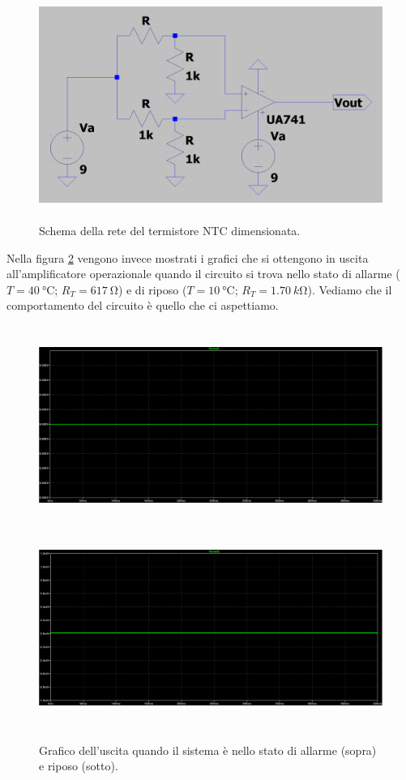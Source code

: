 \documentclass{report}
\begin{document}
\begin{figure}[h!]
	\centering
	\includegraphics[height=7.5cm]{immagini/dimNTC}
	\caption{Schema della rete del termistore NTC dimensionata.} 
	\label{figura:dimNTC}
\end{figure}
Nella figura \ref{figura:NTCout} vengono invece mostrati i grafici che si ottengono in uscita all'amplificatore operazionale quando il circuito si trova nello stato di allarme ($T = \SI{40}{\celsius}$; $R_T=\SI{617}{\ohm}$) e di riposo ($T = \SI{10}{\celsius}$; $R_T=\SI{1.70}{k\ohm}$). Vediamo che il comportamento del circuito è quello che ci aspettiamo. \par
\newpage
\begin{figure}[h!]
	\centering
	\includegraphics[height=6.5cm]{immagini/NTCon}
	\includegraphics[height=6.5cm]{immagini/NTCoff}
	\caption{Grafico dell'uscita quando il sistema è nello stato di allarme (sopra) e riposo (sotto).} 
	\label{figura:NTCout}
\end{figure}
\end{document}
